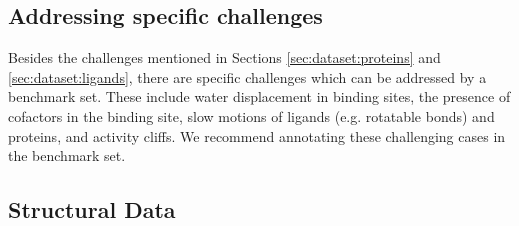 \documentclass[9pt,bestpractices,pubversion]{livecoms}
\begin{document}
\subsection{Addressing specific challenges}
\label{sec:dataset:challenges}

Besides the challenges mentioned in Sections \ref{sec:dataset:proteins} and \ref{sec:dataset:ligands},
there are specific challenges which can be addressed by a benchmark set. These include 
water displacement in binding sites,
the presence of cofactors in the binding site, 
slow motions of ligands (e.g. rotatable bonds) and proteins, and 
activity cliffs.
We recommend annotating these challenging cases in the benchmark set.









\subsection{Structural Data}
\label{sec:struct_data}
\end{document}
